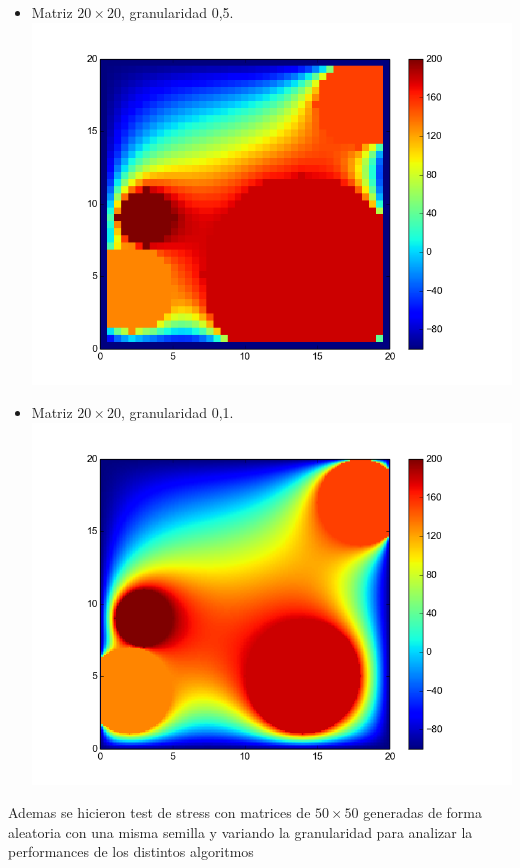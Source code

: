 \begin{itemize}
 \item Matriz $20 \times 20$, granularidad 0,5.\\
  \includegraphics[width=400pt]{imagenes/imagen31.png}
  
   \item Matriz $20 \times 20$, granularidad 0,1.\\
  \includegraphics[width=400pt]{imagenes/imagen41.png}
\end{itemize}


Ademas se hicieron test de stress con matrices de $50 \times 50$ generadas de forma aleatoria con una misma semilla y variando la granularidad para analizar la performances de los distintos algoritmos

